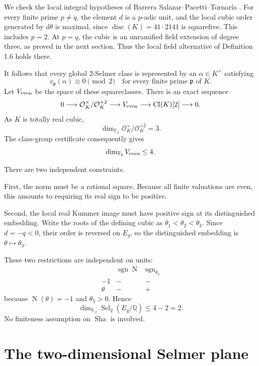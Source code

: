 \documentclass[11pt]{article}
\newcommand{\Q}{\mathbb Q}
\newcommand{\F}{\mathbb F}
\newcommand{\Sha}{\mathop{\mathrm{Sha}}}
\newcommand{\Sel}{\operatorname{Sel}}
\newcommand{\Cl}{\operatorname{Cl}}
\newcommand{\Nm}{\operatorname{N}}
\begin{document}
We check the local integral hypotheses of
Barrera Salazar--Pacetti--Tornar\'ia
\cite[Definition 1.6 and Theorem 1.8]{BPT}.
For every finite prime $p\ne q$, the element $d$
is a $p$-adic unit, and the local cubic order generated
by $d\theta$ is maximal, since
$\operatorname{disc}(K)=41\cdot2141$ is squarefree.
This includes $p=2$.
At $p=q$, the cubic is an unramified field extension
of degree three, as proved in the next section.
Thus the local field alternative of Definition 1.6
holds there.

It follows that every global $2$-Selmer class is
represented by an $\alpha\in K^\times$ satisfying
\[
v_{\mathfrak p}(\alpha)\equiv0\pmod2
\quad\text{for every finite prime }\mathfrak p\text{ of }K.
\]
Let $V_{\rm even}$ be the space of these squareclasses.
There is an exact sequence
\[
0\longrightarrow
\mathcal O_K^\times/\mathcal O_K^{\times2}
\longrightarrow V_{\rm even}
\longrightarrow\Cl(K)[2]\longrightarrow0.
\]
As $K$ is totally real cubic,
\[
\dim_{\F_2}
\mathcal O_K^\times/\mathcal O_K^{\times2}=3.
\]
The class-group certificate consequently gives
\[
\dim_{\F_2}V_{\rm even}\le4.
\]

There are two independent constraints.

First, the norm must be a rational square.
Because all finite valuations are even, this amounts
to requiring its real sign to be positive.

Second, the local real Kummer image must have positive
sign at its distinguished embedding.
Write the roots of the defining cubic as
$\theta_1<\theta_2<\theta_3$.
Since $d=-q<0$, their order is reversed on $E_q$,
so the distinguished embedding is $\theta\mapsto\theta_3$.

These two restrictions are independent on units:
\[
\begin{array}{c|cc}
&\operatorname{sgn}\Nm&\operatorname{sgn}_{\theta_3}\\ \hline
-1&-&-\\
\theta&-&+
\end{array}
\]
because $\Nm(\theta)=-1$ and $\theta_3>0$.
Hence
\begin{equation}\label{upper}
\boxed{\dim_{\F_2}\Sel_2(E_q/\Q)\le4-2=2.}
\end{equation}
No finiteness assumption on $\Sha$ is involved.

\section{The two-dimensional Selmer plane}
\end{document}
